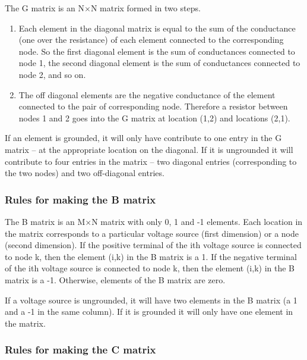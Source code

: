 \documentclass[10pt]{report}
\begin{document}
The G matrix is an N$\times$N matrix formed in two steps.

\begin{enumerate}
\item
Each element in the diagonal matrix is equal to the sum of the
conductance (one over the resistance) of each element connected to the
corresponding node.  So the first diagonal element is the sum of
conductances connected to node 1, the second diagonal element is the
sum of conductances connected to node 2, and so on.
\item
The off diagonal elements are the negative conductance of the element
connected to the pair of corresponding node.  Therefore a resistor
between nodes 1 and 2 goes into the G matrix at location (1,2) and
locations (2,1).
\end{enumerate}

If an element is grounded, it will only have contribute to one entry
in the G matrix -- at the appropriate location on the diagonal.  If it
is ungrounded it will contribute to four entries in the matrix -- two
diagonal entries (corresponding to the two nodes) and two off-diagonal
entries.

\subsubsection{Rules for making the B matrix}

The B matrix is an M$\times$N matrix with only 0, 1 and -1 elements.
Each location in the matrix corresponds to a particular voltage source
(first dimension) or a node (second dimension).  If the positive
terminal of the ith voltage source is connected to node k, then the
element (i,k) in the B matrix is a 1.  If the negative terminal of the
ith voltage source is connected to node k, then the element (i,k) in
the B matrix is a -1.  Otherwise, elements of the B matrix are zero.

\addvspace{12pt}

If a voltage source is ungrounded, it will have two elements in the B
matrix (a 1 and a -1 in the same column).  If it is grounded it will
only have one element in the matrix.

\subsubsection{Rules for making the C matrix}
\end{document}
